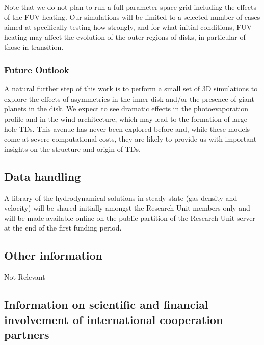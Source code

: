 \documentclass[10pt,fleqn,twoside]{article}
\begin{document}
Note that we do not plan to run a full
parameter space grid including the effects of the FUV heating. 
Our simulations will be limited to a selected number of cases
aimed at specifically testing how strongly, and for what initial
conditions, FUV heating may affect the evolution of the outer regions
of disks, in particular of those in transition.\\

\subsubsection{Future Outlook}

A natural further step of this work is to perform a small set of 3D
simulations to explore the effects of asymmetries in the inner
disk and/or the presence of giant planets in the disk. We expect to
see dramatic effects in the photoevaporation 
profile and in the wind architecture, which may lead to the formation
of large hole TDs. This avenue has never been explored before and,
while these models come at severe computational costs, they are likely to provide us
with important insights on the structure and origin of TDs. 



\subsection{Data handling}

A library of the hydrodynamical solutions in steady state (gas density
and velocity)  will be shared initially amongst the Research Unit
members only and will be made available online on the public partition
of the Research Unit server at the end of the first funding period. 

\subsection{Other information}

Not Relevant

\subsection{Information on scientific and financial involvement of international cooperation partners}
\end{document}
